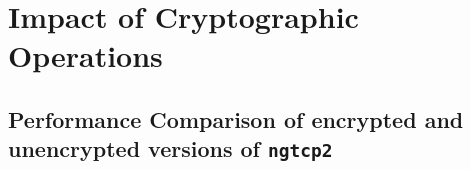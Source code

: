 \documentclass[12pt,a4paper,twoside,openright]{report}
\newcommand\note[2]{{\color{#1}\bf #2}}
\newcommand\simon[1]{\ifcomments{\note{cyan}{SM: #1}}\fi}
\begin{document}
\section{Impact of Cryptographic Operations}




\subsection{Performance Comparison of encrypted and unencrypted versions of \texttt{ngtcp2}}
\end{document}
